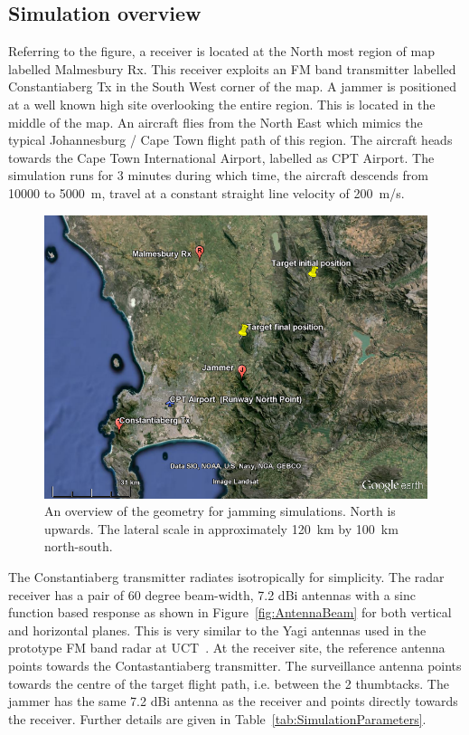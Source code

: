 \documentclass[conference]{IEEEtran}
\begin{document}
\subsection{Simulation overview}

Referring to the figure, a receiver is located at the North most region of map labelled Malmesbury Rx. This receiver exploits an FM band transmitter labelled Constantiaberg Tx in the South West corner of the map. A jammer is positioned at a well known high site overlooking the entire region. This is located in the middle of the map. An aircraft flies from the North East which mimics the typical Johannesburg / Cape Town flight path of this region. The aircraft heads towards the Cape Town International Airport, labelled as CPT Airport. The simulation runs for 3 minutes during which time, the aircraft descends from 10000 to 5000~m, travel at a constant straight line velocity of 200~m/s. 

\begin{figure}[htbp]
\begin{center}
\includegraphics[width=0.9\columnwidth]{figs/Simulations/GEGeometryOverview.png}
\caption{An overview of the geometry for jamming simulations. North is upwards. The lateral scale in approximately 120~km by 100~km north-south.}
\label{fig:SimGeometryGE}
\end{center}
\end{figure}

The Constantiaberg transmitter radiates isotropically for simplicity. The radar receiver has a pair of 60 degree beam-width, 7.2 dBi antennas with a sinc function based response as shown in Figure~\ref{fig:AntennaBeam} for both vertical and horizontal planes. This is very similar to the Yagi antennas used in the prototype FM band radar at UCT~\cite{tong:14}. At the receiver site, the reference antenna points towards the Contastantiaberg transmitter. The surveillance antenna points towards the centre of the target flight path, i.e. between the 2 thumbtacks. The jammer has the same 7.2 dBi antenna as the receiver and points directly towards the receiver. Further details are given in Table~\ref{tab:SimulationParameters}.
\end{document}
